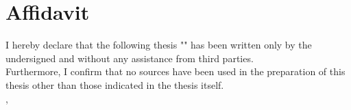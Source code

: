 
\vspace*{100mm}
\begin{minipage}{109.5mm}
\section*{Affidavit}
I hereby declare that the following thesis "\metaTitle" has been
written only by the undersigned and without any assistance from third
parties.\\

Furthermore, I confirm that no sources have been used in the preparation
of this thesis other than those indicated in the thesis itself.\\[2cm]
\metaCity, \metaDate
\end{minipage}
